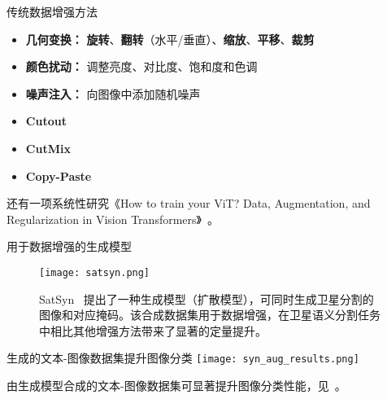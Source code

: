 \begin{refsection}
  \begin{frame}{传统数据增强方法}
    \begin{itemize}
      \item \textbf{几何变换：} \textbf{旋转}、\textbf{翻转}（水平/垂直）、\textbf{缩放}、\textbf{平移}、\textbf{裁剪}
      \item \textbf{颜色扰动：} 调整亮度、对比度、饱和度和色调
      \item \textbf{噪声注入：} 向图像中添加随机噪声
      \item \textbf{Cutout}~\parencite{devriesImprovedRegularizationConvolutional2017}
      \item \textbf{CutMix}~\parencite{yunCutMixRegularizationStrategy2019}
      \item \textbf{Copy-Paste}~\parencite{ghiasiSimpleCopyPasteStrong2021}
    \end{itemize}
    还有一项系统性研究《How to train your ViT? Data, Augmentation,  and Regularization in Vision Transformers》~\parencite{steinerHowTrainYour2022}。
    \bottomleftrefs
  \end{frame}
\end{refsection}

\begin{refsection}
  \begin{frame}{用于数据增强的生成模型}
    \begin{figure}
      \centering
      \texttt{[image: satsyn.png]}
      
      \vspace{0.5em}
      \caption{\scriptsize SatSyn~\parencite{tokerSatSynthAugmentingImageMask2024} 提出了一种生成模型（扩散模型），可同时生成卫星分割的图像和对应掩码。该合成数据集用于数据增强，在卫星语义分割任务中相比其他增强方法带来了显著的定量提升。}
    \end{figure}

    \bottomleftrefs
  \end{frame}
\end{refsection}

\begin{refsection}
  \begin{frame}{生成的文本-图像数据集提升图像分类}
    \centering
    \texttt{[image: syn\_aug\_results.png]}
    
    
    \scriptsize
    由生成模型合成的文本-图像数据集可显著提升图像分类性能，见~\parencite{heSYNTHETICDATAGENERATIVE2022}。
    \bottomleftrefs
  \end{frame}
\end{refsection}

